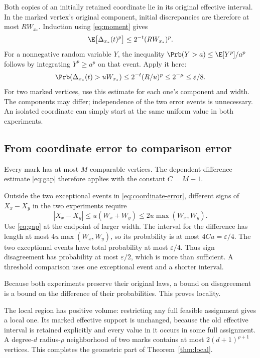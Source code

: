 Both copies of an initially retained coordinate lie in its original effective interval. In the marked vertex's original component, initial discrepancies are therefore at most \(R W_{x_*}\). Induction using \eqref{eq:moment} gives
\[
\E\bigl[\Delta_{x_*}(t)^p\bigr]\le 2^{-t}(R W_{x_*})^p.
\]
For a nonnegative random variable \(Y\), the inequality
\(\Prb(Y>a)\le\E[Y^p]/a^p\) follows by integrating \(Y^p\ge a^p\) on that event. Apply it here:
\begin{equation}\label{eq:coordinate-error}
\Prb(\Delta_{x_*}(t)>uW_{x_*})
\le2^{-t}(R/u)^p
\le2^{-\mu}\le\varepsilon/8.
\end{equation}
For two marked vertices, use this estimate for each one's component and width. The components may differ; independence of the two error events is unnecessary. An isolated coordinate can simply start at the same uniform value in both experiments.

\subsection{From coordinate error to comparison error}

Every mark has at most \(M\) comparable vertices. The dependent-difference estimate \eqref{eq:gap} therefore applies with the constant \(C=M+1\).

Outside the two exceptional events in \eqref{eq:coordinate-error}, different signs of \(X_x-X_y\) in the two experiments require
\[
|X_x-X_y|
\le u(W_x+W_y)\le 2u\max(W_x,W_y).
\]
Use \eqref{eq:gap} at the endpoint of larger width. The interval for the difference has length at most \(4u\max(W_x,W_y)\), so its probability is at most \(4Cu=\varepsilon/4\). The two exceptional events have total probability at most \(\varepsilon/4\). Thus sign disagreement has probability at most \(\varepsilon/2\), which is more than sufficient. A threshold comparison uses one exceptional event and a shorter interval.

Because both experiments preserve their original laws, a bound on disagreement is a bound on the difference of their probabilities. This proves locality.

The local region has positive volume: restricting any full feasible assignment gives a local one. Its marked effective support is unchanged, because the old effective interval is retained explicitly and every value in it occurs in some full assignment. A degree-\(d\) radius-\(\rho\) neighborhood of two marks contains at most \(2(d+1)^{\rho+1}\) vertices. This completes the geometric part of Theorem~\ref{thm:local}.

